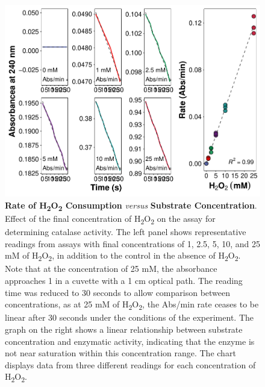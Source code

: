 \documentclass[
  9pt,
  american,
  a5paper,
  extrafontsizes,onecolumn,openright
  ]{memoir}
\begin{document}
\begin{figure}

{\centering \includegraphics[width=1\linewidth]{Volume-1_files/figure-latex/fig-substrate-curves-1} 

}

\caption{\textbf{Rate of H\textsubscript{2}O\textsubscript{2} Consumption} \emph{versus} \textbf{Substrate Concentration}. Effect of the final concentration of H\textsubscript{2}O\textsubscript{2} on the assay for determining catalase activity. The left panel shows representative readings from assays with final concentrations of 1, 2.5, 5, 10, and 25 mM of H\textsubscript{2}O\textsubscript{2}, in addition to the control in the absence of H\textsubscript{2}O\textsubscript{2}. Note that at the concentration of 25 mM, the absorbance approaches 1 in a cuvette with a 1 cm optical path. The reading time was reduced to 30 seconds to allow comparison between concentrations, as at 25 mM of H\textsubscript{2}O\textsubscript{2}, the Abs/min rate ceases to be linear after 30 seconds under the conditions of the experiment. The graph on the right shows a linear relationship between substrate concentration and enzymatic activity, indicating that the enzyme is not near saturation within this concentration range. The chart displays data from three different readings for each concentration of H\textsubscript{2}O\textsubscript{2}.}\label{fig:fig-substrate-curves}
\end{figure}

\normalsize
\end{document}
